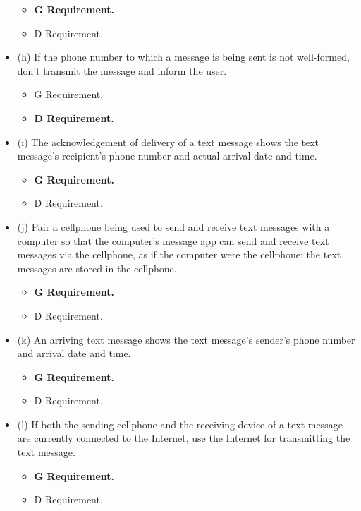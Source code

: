 \documentclass{article}
\begin{document}
\begin{itemize}
    \begin{itemize}
        \item \textbf{G Requirement.} \checkmark
        \item D Requirement.
    \end{itemize}
    \item (h) If the phone number to which a message is being sent is not well-formed, don't transmit the message and inform the user.
    \begin{itemize}
        \item G Requirement.
        \item \textbf{D Requirement.} \checkmark
    \end{itemize}
    \item (i) The acknowledgement of delivery of a text message shows the text message's recipient's phone number and actual arrival date and time.
    \begin{itemize}
        \item \textbf{G Requirement.} \checkmark
        \item D Requirement.
    \end{itemize}
    \item (j) Pair a cellphone being used to send and receive text messages with a computer so that the computer's message app can send and receive text messages via the cellphone, as if the computer were the cellphone; the text messages are stored in the cellphone.
    \begin{itemize}
        \item \textbf{G Requirement.} \checkmark
        \item D Requirement.
    \end{itemize}
    \item (k) An arriving text message shows the text message's sender's phone number and arrival date and time.
    \begin{itemize}
        \item \textbf{G Requirement.} \checkmark
        \item D Requirement.
    \end{itemize}
    \item (l) If both the sending cellphone and the receiving device of a text message are currently connected to the Internet, use the Internet for transmitting the text message.
    \begin{itemize}
        \item \textbf{G Requirement.} \checkmark
        \item D Requirement.

\end{itemize}
\end{itemize}
\end{document}
